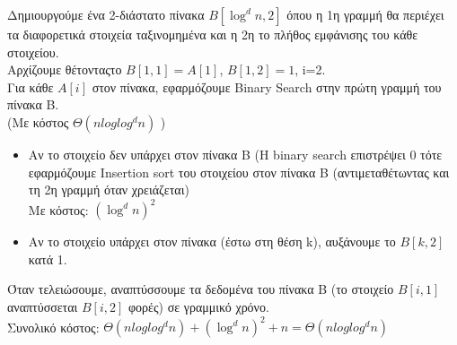 \documentclass[a4paper,10pt]{article} \usepackage{anysize}
\newcommand{\tab}{\hspace*{3em}}
\begin{document}
Δημιουργούμε ένα 2-διάστατο πίνακα $B[\log ^d {n},2]$ όπου η 1η γραμμή
θα περιέχει τα διαφορετικά στοιχεία ταξινομημένα και η 2η το πλήθος
εμφάνισης του κάθε στοιχείου.\\
Αρχίζουμε θέτονταςτο $B[1,1] = A[1]$, $B[1,2] = 1$, i=2.\\
Για κάθε $A[i]$ στον πίνακα, εφαρμόζουμε Binary Search στην πρώτη γραμμή του
πίνακα Β. \\
(Με κόστος $\Theta (n log{log^d{n}})$ )
\begin{itemize}
\item Αν το στοιχείο δεν υπάρχει στον πίνακα B (H binary search επιστρέψει 0
\tab τότε εφαρμόζουμε Insertion sort του στοιχείου στον πίνακα Β
(αντιμεταθέτωντας και τη 2η γραμμή όταν χρειάζεται)\\
Με κόστος: $(\log ^d{n})^2$
\item Αν το στοιχείο υπάρχει στον πίνακα (έστω στη θέση k), αυξάνουμε το
$B[k,2]$ κατά 1.
\end{itemize}
Όταν τελειώσουμε, αναπτύσσουμε τα δεδομένα του πίνακα Β (το στοιχείο $B[i,1]$
αναπτύσσεται $B[i,2]$ φορές) σε γραμμικό χρόνο.\\

Συνολικό κόστος: $\Theta (n log{log^d{n}}) + (\log ^d{n})^2 + n = \Theta (n log{log^d{n}}) $





\end{document}
